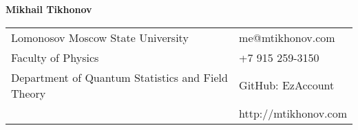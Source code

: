 \documentclass[letterpaper,10pt,oneside,utf8]{article}
\begin{document}
	
	
	\noindent  \LARGE{\textbf{Mikhail Tikhonov}}  \\
	\vspace{-2ex}
	\normalsize
	
	
	
	\begin{center}
		\begin{tabular}{l l}
			Lomonosov Moscow State University   & \hspace{1in} 
			{me@mtikhonov.com} \\
			Faculty of Physics   & \hspace{1in} +7 915 259-3150 \\
			Department of Quantum Statistics and Field Theory         &\hspace{1in} GitHub: EzAccount  \\
			 & \hspace{1in} http://mtikhonov.com \\
		\end{tabular}
	\end{center}
	
	
	
\end{document}
